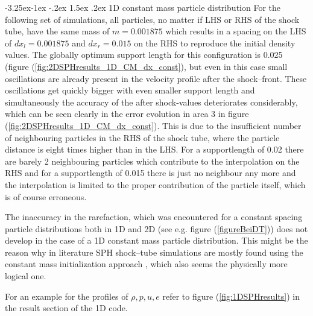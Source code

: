 \documentclass{report}
\makeatletter
\renewcommand\paragraph{\@startsection{paragraph}{4}{\z@}%
  {-3.25ex\@plus -1ex \@minus -.2ex}%
  {1.5ex \@plus .2ex}%
  {\normalfont\normalsize\bfseries}}
\makeatother
\begin{document}
   
\paragraph{1D constant mass particle distribution}
For the following set of simulations, all particles, no matter if LHS or RHS of the shock tube, have the same mass of $m=0.001875$ which results in a spacing on the LHS of $dx_l=0.001875$ and $dx_r=0.015$ on the RHS to reproduce the initial density values. 
The globally optimum support length for this configuration is 0.025 (figure (\ref{fig:2DSPHresults_1D_CM_dx_const}), but even in this case small oscillations are already present in the velocity profile after the shock--front. These oscillations get quickly bigger with even smaller support length and simultaneously the accuracy of the after shock-values deteriorates considerably, which can be seen clearly in the error evolution in area 3 in figure (\ref{fig:2DSPHresults_1D_CM_dx_const}). 
This is due to the insufficient number of neighbouring particles in the RHS of the shock tube, where the particle distance is eight times higher than in the LHS. For a supportlength of 0.02 there are barely 2 neighbouring particles which contribute to the interpolation on the RHS and for a supportlength of 0.015 there is just no neighbour any more and the interpolation is limited to the proper contribution of the particle itself, which is of course erroneous. 

The inaccuracy in the rarefaction, which was encountered for a constant spacing particle distributions both in 1D and 2D (see e.g. figure (\ref{figureBeiDT})) does not develop in the case of a 1D constant mass particle distribution. This might be the reason why 
in literature SPH shock--tube simulations are mostly found using the constant mass initialization approach \cite{Monaghan1983,Monaghan2005,Liu2003}, which also seems the physically more logical one.

For an example for the profiles of $\rho, p, u, e$ refer to figure (\ref{fig:1DSPHresults}) in the result section of the 1D code. 
\end{document}
